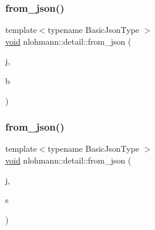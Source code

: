 \mbox{\label{namespacenlohmann_1_1detail_a58117f225f43d03e3a0a4a6f3d77c9d9}} 
\subsubsection{\texorpdfstring{from\+\_\+json()}{from\_json()}\hspace{0.1cm}{\footnotesize\ttfamily [2/18]}}
{\footnotesize\ttfamily template$<$typename Basic\+Json\+Type $>$ \\
\hyperlink{namespacenlohmann_1_1detail_a59fca69799f6b9e366710cb9043aa77d}{void} nlohmann\+::detail\+::from\+\_\+json (\begin{DoxyParamCaption}\item[{const Basic\+Json\+Type \&}]{j,  }\item[{typename Basic\+Json\+Type\+::boolean\+\_\+t \&}]{b }\end{DoxyParamCaption})}

\mbox{\label{namespacenlohmann_1_1detail_ad74d89f77ada7a57eff38b43d4bf2335}} 
\subsubsection{\texorpdfstring{from\+\_\+json()}{from\_json()}\hspace{0.1cm}{\footnotesize\ttfamily [3/18]}}
{\footnotesize\ttfamily template$<$typename Basic\+Json\+Type $>$ \\
\hyperlink{namespacenlohmann_1_1detail_a59fca69799f6b9e366710cb9043aa77d}{void} nlohmann\+::detail\+::from\+\_\+json (\begin{DoxyParamCaption}\item[{const Basic\+Json\+Type \&}]{j,  }\item[{typename Basic\+Json\+Type\+::string\+\_\+t \&}]{s }\end{DoxyParamCaption})}

\mbox{\label{namespacenlohmann_1_1detail_a2932f2bc2943dac6d51669312f4fc0f5}} 

